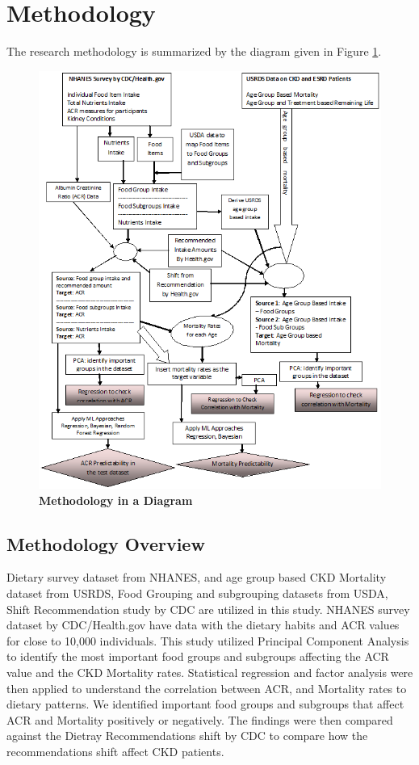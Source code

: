 \section*{Methodology}
The research methodology is summarized by the diagram given in Figure \ref{methodology-new}. 

\begin{figure}
\centering
\includegraphics[scale=0.48]{./images/methodologies-enhanced}
\caption{\textbf{Methodology in a Diagram}}
\label{methodology-new}
\end{figure}

\subsection*{Methodology Overview}
 Dietary survey dataset from NHANES, and age group based CKD Mortality dataset from USRDS, Food Grouping and subgrouping datasets from USDA, Shift Recommendation study by CDC are utilized in this study. NHANES survey dataset by CDC/Health.gov have data with the dietary habits and ACR values for close to 10,000 individuals.  This study utilized Principal Component Analysis to identify the most important food groups and subgroups affecting the ACR value and the CKD Mortality rates.  Statistical regression and factor analysis were then applied to understand the correlation between ACR, and Mortality rates to dietary patterns. We identified important food groups and subgroups that affect ACR and Mortality positively or negatively. The findings were then compared against the Dietray Recommendations shift  \cite{Health2015} by CDC to compare how the recommendations shift affect CKD patients.


